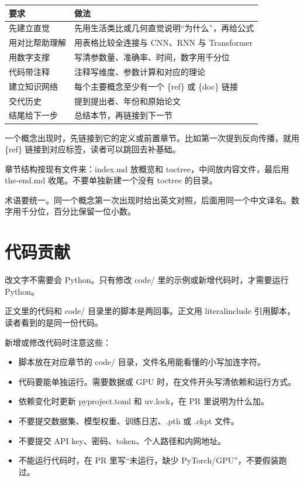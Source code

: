 \documentclass[UTF8,fontset=none,a4paper,11pt]{ctexart}
\newcommand{\code}[1]{{\CJKsetecglue{}\ttfamily #1}}
\begin{document}
\begin{center}
\small
\begin{tabularx}{\linewidth}{@{}L{4.2cm}Y@{}}
\toprule
要求 & 做法 \\
\midrule
先建立直觉 & 先用生活类比或几何直觉说明“为什么”，再给公式 \\
用对比帮助理解 & 用表格比较全连接与 CNN、RNN 与 Transformer \\
用数字支撑 & 写清参数量、准确率、时间，数字用千分位 \\
代码带注释 & 注释写维度、参数计算和对应的理论 \\
建立知识网络 & 每个主要概念至少有一个 \code{\{ref\}} 或 \code{\{doc\}} 链接 \\
交代历史 & 提到提出者、年份和原始论文 \\
结尾给下一步 & 总结本节，再链接到下一节 \\
\bottomrule
\end{tabularx}
\end{center}

一个概念出现时，先链接到它的定义或前置章节。比如第一次提到反向传播，就用 \code{\{ref\}} 链接到对应标签，读者可以跳回去补基础。

章节结构按现有文件来：\code{index.md} 放概览和 toctree，中间放内容文件，最后用 \code{the-end.md} 收尾。不要单独新建一个没有 toctree 的目录。

术语要统一。同一个概念第一次出现时给出英文对照，后面用同一个中文译名。数字用千分位，百分比保留一位小数。

\clearpage

\section{代码贡献}\label{sec:code-contrib}

改文字不需要会 Python。只有修改 \code{code/} 里的示例或新增代码时，才需要运行 Python。

正文里的代码和 \code{code/} 目录里的脚本是两回事。正文用 \code{literalinclude} 引用脚本，读者看到的是同一份代码。

新增或修改代码时注意这些：

\begin{itemize}[leftmargin=1.8em,itemsep=2pt]
  \item 脚本放在对应章节的 \code{code/} 目录，文件名用能看懂的小写加连字符。
  \item 代码要能单独运行。需要数据或 GPU 时，在文件开头写清依赖和运行方式。
  \item 依赖变化时更新 \code{pyproject.toml} 和 \code{uv.lock}，在 PR 里说明为什么加。
  \item 不要提交数据集、模型权重、训练日志、\code{.pth} 或 \code{.ckpt} 文件。
  \item 不要提交 API key、密码、token、个人路径和内网地址。
  \item 不能运行代码时，在 PR 里写“未运行，缺少 PyTorch/GPU”，不要假装跑过。
\end{itemize}
\end{document}
